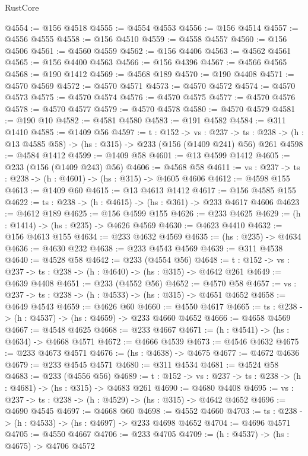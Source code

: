 \begin{lexlean}{RustCore}
\begin{coremodule}
@4554 := @156 @4518
@4555 := @4554 @4553
@4556 := @156 @4514
@4557 := @4556 @4555
@4558 := @156 @4510
@4559 := @4558 @4557
@4560 := @156 @4506
@4561 := @4560 @4559
@4562 := @156 @4406
@4563 := @4562 @4561
@4565 := @156 @4400 @4563
@4566 := @156 @4396
@4567 := @4566 @4565
@4568 := @190 @1412
@4569 := @4568 @189
@4570 := @190 @4408
@4571 := @4570 @4569
@4572 := @4570 @4571
@4573 := @4570 @4572
@4574 := @4570 @4573
@4575 := @4570 @4574
@4576 := @4570 @4575
@4577 := @4570 @4576
@4578 := @4570 @4577
@4579 := @4570 @4578
@4580 := @4570 @4579
@4581 := @190 @10
@4582 := @4581 @4580
@4583 := @191 @4582
@4584 := @311 @1410
@4585 := @1409 @56
@4597 := {t : @152} ->
  {vs : @237} ->
  {ts : @238} -> (h : @13 @4585 @58) -> (hs : @315) -> @233 (@156 (@1409 @241) @56) @261
@4598 := @4584 @1412
@4599 := @1409 @58
@4601 := @13 @4599 @1412
@4605 := @233 (@156 (@1409 @243) @56)
@4606 := @4568 @58
@4611 := {vs : @237} -> {ts : @238} -> (h : @4601) -> (hs : @315) -> @4605 @4606
@4612 := @4598 @155
@4613 := @1409 @60
@4615 := @13 @4613 @1412
@4617 := @156 @4585 @155
@4622 := {ts : @238} -> (h : @4615) -> (hs : @361) -> @233 @4617 @4606
@4623 := @4612 @189
@4625 := @156 @4599 @155
@4626 := @233 @4625
@4629 := (h : @1414) -> (hs : @235) -> @4626 @4569
@4630 := @4623 @4410
@4632 := @156 @4613 @155
@4634 := @233 @4632 @4569
@4635 := (hs : @235) -> @4634
@4636 := @4630 @232
@4638 := @233 @4543 @4569
@4639 := @311 @4538
@4640 := @4528 @58
@4642 := @233 (@4554 @56)
@4648 := {t : @152} -> {vs : @237} -> {ts : @238} -> (h : @4640) -> (hs : @315) -> @4642 @261
@4649 := @4639 @4408
@4651 := @233 (@4552 @56)
@4652 := @4570 @58
@4657 := {vs : @237} -> {ts : @238} -> (h : @4533) -> (hs : @315) -> @4651 @4652
@4658 := @4649 @4543
@4659 := @4626 @60
@4660 := @4550 @4617
@4665 := {ts : @238} -> (h : @4537) -> (hs : @4659) -> @233 @4660 @4652
@4666 := @4658 @4569
@4667 := @4548 @4625
@4668 := @233 @4667
@4671 := (h : @4541) -> (hs : @4634) -> @4668 @4571
@4672 := @4666 @4539
@4673 := @4546 @4632
@4675 := @233 @4673 @4571
@4676 := (hs : @4638) -> @4675
@4677 := @4672 @4636
@4679 := @233 @4545 @4571
@4680 := @311 @4534
@4681 := @4524 @58
@4683 := @233 (@4556 @56)
@4689 := {t : @152} -> {vs : @237} -> {ts : @238} -> (h : @4681) -> (hs : @315) -> @4683 @261
@4690 := @4680 @4408
@4695 := {vs : @237} -> {ts : @238} -> (h : @4529) -> (hs : @315) -> @4642 @4652
@4696 := @4690 @4545
@4697 := @4668 @60
@4698 := @4552 @4660
@4703 := {ts : @238} -> (h : @4533) -> (hs : @4697) -> @233 @4698 @4652
@4704 := @4696 @4571
@4705 := @4550 @4667
@4706 := @233 @4705
@4709 := (h : @4537) -> (hs : @4675) -> @4706 @4572

\end{coremodule}
\end{lexlean}

